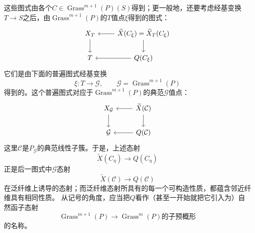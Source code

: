 这些图式由各个$C\in\operatorname{Grass}^{m+1}(P)(S)$得到；更一般地，还要考虑经基变换$T\to S$之后，由$\operatorname{Grass}^{m+1}(P)$的$T$值点$\xi$得到的图式：
\[
\begin{tikzcd}
X_T \arrow[d] & \widetilde X(C_\xi)=\widetilde X_T(C_\xi) \arrow[l] \arrow[d] \\
T & Q(C_\xi) \arrow[l]
\end{tikzcd}
\]
它们是由下面的普遍图式经基变换
\[
\xi:T\longrightarrow \mathcal G,
\qquad\mathcal G=\operatorname{Grass}^{m+1}(P)
\]
得到的。这个普遍图式对应于$\operatorname{Grass}^{m+1}(P)$的典范$\mathcal G$值点：
\[
\begin{tikzcd}
X_{\mathcal G} \arrow[d] & \widetilde X(\mathcal C) \arrow[l] \arrow[d] \\
\mathcal G & Q(\mathcal C) \arrow[l]
\end{tikzcd}
\]
这里$\mathcal C$是$P_{\mathcal G}$的典范线性子簇。于是，上述态射
\[
\widetilde X(C_\eta)\longrightarrow Q(C_\eta)
\]
正是后一图式中$\mathcal G$态射
\[
\widetilde X(\mathcal C)\longrightarrow Q(\mathcal C)
\]
在泛纤维上诱导的态射；而泛纤维态射所具有的每一个可构造性质，都蕴含邻近纤维具有相同性质。
从记号的角度，应当把$Q$看作（甚至一开始就把它引入为）自然函子态射
\[
\operatorname{Grass}^{m+1}(P)
\longrightarrow
\text{$\operatorname{Grass}^{m}(P)$的子预概形}
\]
的名称。
